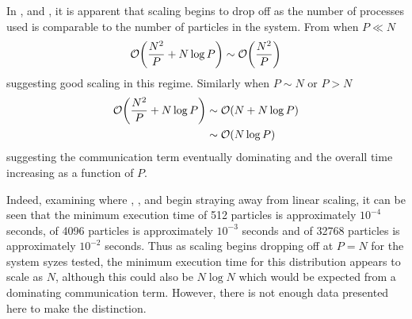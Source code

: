 \begin{figure}[!h]
    
    \caption{}
    \label{fig:v0_replicated_pair_operation_4096_logtime}
\end  {figure}

\begin{figure}[!h]
    
    \caption{}
    \label{fig:v0_replicated_pair_operation_32768_logtime}
\end  {figure}

\vZeroTimeExplanation
    {}
    {}
    {}
    {\pairoperation{}}
    {\replicateddata{}}

In ,
 and
,
it is apparent that scaling begins to drop off as the number
of processes used is comparable to the number of particles in the system.
%
From  when $P \ll{} N$
\begin{equation}
    \mathcal{O}{\left({ \frac{N^2}{P} + N\log{P} }\right)} \sim{} \mathcal{O}{\left({ \frac{N^2}{P} }\right)}
\end  {equation}
suggesting good scaling in this regime.
%
Similarly when $P \sim{} N$
or $P > N$
\begin{align}
    \mathcal{O}{\left({ \frac{N^2}{P} + N\log{P} }\right)}
        &\sim{} \mathcal{O}{\left({ N + N\log{P} }\right)} \\
        &\sim{} \mathcal{O}{\left({ N\log{P} }\right)}
\end  {align}
%
suggesting the communication term eventually dominating and
the overall time increasing as a function of $P$.

Indeed, examining where
,
,
 and
begin straying away from linear scaling,
it can be seen that the minimum execution time
of 512 particles is approximately $10^{-4}$ seconds,
of 4096 particles is approximately $10^{-3}$ seconds and
of 32768 particles is approximately $10^{-2}$ seconds.
%
Thus as scaling begins dropping off at $P = N$ for the system syzes tested,
the minimum execution time for this distribution appears to scale as $N$,
although this could also be $N\log{N}$ which would be expected from
a dominating communication term.
%
However, there is not enough data presented here to make the distinction.
